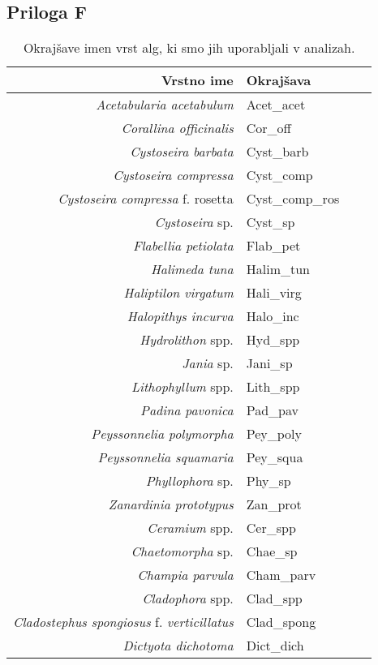 \newpage
\subsection*{Priloga F}

\begin{table}[htb]\footnotesize
\begin{center}
\caption[Okrajšav imen vrst alg]{Okrajšave imen vrst alg, ki smo jih uporabljali v analizah.}
\label{tab:okrasave:alg}
 \begin{tabular}{r l r l}
 \toprule
 Vrstno ime & Okrajšava \\
 \midrule
\emph{Acetabularia acetabulum} & Acet\_acet \\
\emph{Corallina officinalis} & Cor\_off \\
\emph{Cystoseira barbata} & Cyst\_barb \\
\emph{Cystoseira compressa} & Cyst\_comp \\
\emph{Cystoseira compressa} f. rosetta & Cyst\_comp\_ros \\ 
\emph{Cystoseira} sp. & Cyst\_sp \\
\emph{Flabellia petiolata} & Flab\_pet \\ 
\emph{Halimeda tuna} & Halim\_tun \\
\emph{Haliptilon virgatum} & Hali\_virg \\ 
\emph{Halopithys incurva} & Halo\_inc \\
\emph{Hydrolithon} spp. & Hyd\_spp \\
\emph{Jania} sp. & Jani\_sp \\
\emph{Lithophyllum} spp. & Lith\_spp \\ 
\emph{Padina pavonica} & Pad\_pav \\
\emph{Peyssonnelia polymorpha} & Pey\_poly \\ 
\emph{Peyssonnelia squamaria} & Pey\_squa \\
\emph{Phyllophora} sp. & Phy\_sp \\
\emph{Zanardinia prototypus} & Zan\_prot \\ 
\emph{Ceramium} spp. & Cer\_spp \\
\emph{Chaetomorpha} sp. & Chae\_sp \\ 
\emph{Champia parvula} & Cham\_parv \\
\emph{Cladophora} spp. & Clad\_spp \\
\emph{Cladostephus spongiosus} f. \emph{verticillatus} & Clad\_spong \\
\emph{Dictyota dichotoma} & Dict\_dich \\

\end{tabular}
\end{center}
\end{table}
